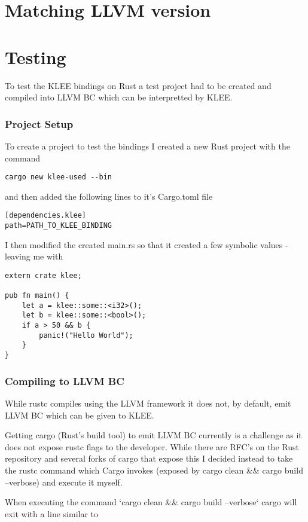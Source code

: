 \documentclass{report}
\begin{document}
\chapter {Matching LLVM version}
\chapter {Testing}

To test the KLEE bindings on Rust a test project had to be created and compiled into LLVM BC which can be interpretted by KLEE.

\subsection {Project Setup}
To create a project to test the bindings I created a new Rust project with the command
\begin{lstlisting}
cargo new klee-used --bin
\end{lstlisting}

and then added the following lines to it's Cargo.toml file
\begin{lstlisting}
[dependencies.klee]
path=PATH_TO_KLEE_BINDING
\end{lstlisting}

I then modified the created main.rs so that it created a few symbolic values - leaving me with
\begin{lstlisting}
extern crate klee;

pub fn main() {
    let a = klee::some::<i32>();
    let b = klee::some::<bool>();
    if a > 50 && b {
    	panic!("Hello World");
    }
}
\end{lstlisting}

\subsection {Compiling to LLVM BC}

While rustc compiles using the LLVM framework it does not, by default, emit LLVM BC which can be given to KLEE.

Getting cargo (Rust's build tool) to emit LLVM BC currently is a challenge as it does not expose rustc flags to the developer. While there are RFC's on the Rust repository and several forks of cargo that expose this I decided instead to take the rustc command which Cargo invokes (exposed by cargo clean \&\& cargo build --verbose) and execute it myself.

When executing the command `cargo clean \&\& cargo build --verbose` cargo will exit with a line similar to
\end{document}

